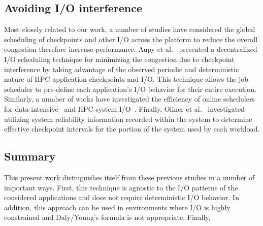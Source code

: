 \subsection{Avoiding I/O interference}

Most closely related to our work, a number of studies have considered the
global scheduling of checkpoints and other I/O across the platform to reduce
the overall congestion therefore increase performance.  Aupy et
al.~\cite{Aupy:2017:Periodic} presented a decentralized I/O scheduling
technique for minimizing the congestion due to checkpoint interference by
taking advantage of the observed periodic and deterministic nature of HPC
application checkpoints and I/O.  This technique allows the job scheduler to
pre-define each application’s I/O behavior for their entire execution.
Similarly, a number of works have investigated the efficiency of online
schedulers for data intensive~\cite{Groot2013} and HPC system
I/O~\cite{Dorier2014,Gainaru:2015:Scheduling,Zhou:2015:IOAware,Herbein2016}.
Finally, Oliner et al.~\cite{Oliner:2006:Cooperative} investigated utilizing
system reliability information recorded within the system to determine
effective checkpoint intervals for the portion of the system used by each
workload.

\subsection{Summary}

This present work distinguishes itself from these previous studies in a number
of important ways.  First, this technique is agnostic to the I/O patterns of
the considered applications and does not require deterministic I/O behavior.
In addition, this approach can be used in environments where I/O is highly
constrained and Daly/Young's formula is not appropriate.  Finally,
